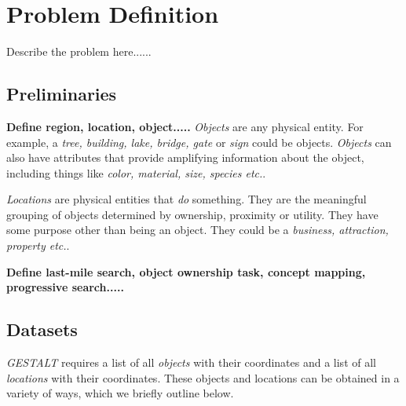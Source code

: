 \section{Problem Definition}
\label{section:problem}

Describe the problem here......

\subsection{Preliminaries}
\textbf{Define region, location, object.....}
\emph{Objects} are any physical entity. For example, a \textit{tree, building, lake, bridge, gate} or \textit{sign} could be objects. \textit{Objects} can also have attributes that provide amplifying information about the object, including things like \textit{color, material, size, species etc.}. 

\emph{Locations} are physical entities that \textit{do} something. They are the meaningful grouping of objects determined by ownership, proximity or utility. They have some purpose other than being an object. They could be a \textit{business, attraction, property etc.}. 

\textbf{Define last-mile search, object ownership task, concept mapping, progressive search.....}


\subsection{Datasets}
\emph{GESTALT} requires a list of all \textit{objects} with their coordinates and a list of all \textit{locations} with their coordinates. These objects and locations can be obtained in a variety of ways, which we briefly outline below. 




